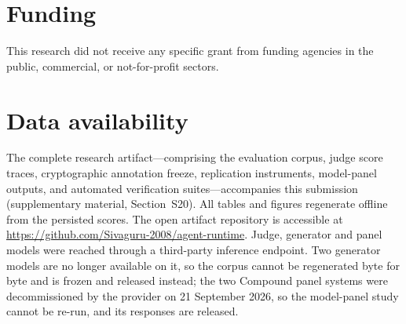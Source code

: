 \section*{Funding}
This research did not receive any specific grant from funding agencies in the public, commercial, or not-for-profit sectors.

\section*{Data availability}
The complete research artifact---comprising the evaluation corpus, judge score traces, cryptographic annotation freeze, replication instruments, model-panel outputs, and automated verification suites---accompanies this submission (supplementary material, Section~S20). All tables and figures regenerate offline from the persisted scores. The open artifact repository is accessible at \url{https://github.com/Sivaguru-2008/agent-runtime}. Judge, generator and panel models were reached through a third-party inference endpoint. Two generator models are no longer available on it, so the corpus cannot be regenerated byte for byte and is frozen and released instead; the two Compound panel systems were decommissioned by the provider on 21 September 2026, so the model-panel study cannot be re-run, and its responses are released.
